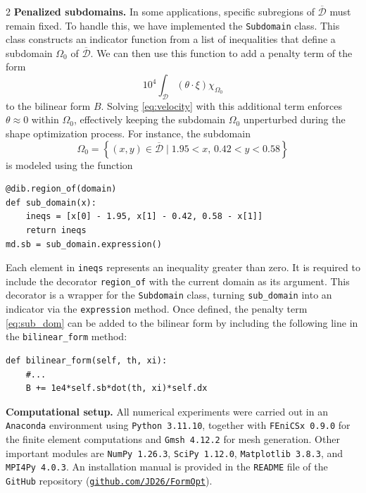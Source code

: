 \documentclass[a4paper, oneside]{article}
\newcommand{\Om}{\Omega}
\newcommand{\code}[1]{\texttt{#1}}
\begin{document}
\begin{multicols}{2}
\vspace*{0.5cm}
\noindent \textbf{Penalized subdomains.}
In some applications, specific subregions of $\overline{\mathcal{D}}$ must remain fixed. 
To handle this, we have implemented the \code{Subdomain} class.
This class constructs an indicator function from a list of inequalities that
define a subdomain $\Om_0$ of $\overline{\mathcal{D}}$. We can then use this function
to add a penalty term of the form
\begin{equation}\label{eq:sub_dom}
	{10}^4 \int_{\mathcal{D}} (\theta \cdot \xi) \chi_{\Omega_0}
\end{equation}
to the bilinear form $B$.
Solving \eqref{eq:velocity} with this additional term enforces $\theta \approx 0$ within $\Omega_0$, effectively keeping the subdomain $\Omega_0$ unperturbed during the shape optimization process.
For instance, the subdomain
\begin{equation}
	\Omega_0 = \left\{ (x,y)\in \overline{\mathcal{D}} \mid 1.95 < x,\, 0.42 < y < 0.58   \right\}
\end{equation}
is modeled using the function
\begin{lstlisting}
@dib.region_of(domain)
def sub_domain(x):
    ineqs = [x[0] - 1.95, x[1] - 0.42, 0.58 - x[1]]
    return ineqs
md.sb = sub_domain.expression()
\end{lstlisting}
Each element in \code{ineqs} represents an inequality greater than zero.
It is required to include the decorator \code{region\_of} with the
current domain as its argument. This decorator is a wrapper for the \code{Subdomain} class,
turning \code{sub\_domain} into an indicator via the \code{expression} method.
Once defined, the penalty term \eqref{eq:sub_dom}
can be added to the bilinear form by including the
following line in the \code{bilinear\_form} method:
\begin{lstlisting}
def bilinear_form(self, th, xi):
	#...
	B += 1e4*self.sb*dot(th, xi)*self.dx
\end{lstlisting}

\vspace*{0.5cm}
\noindent \textbf{Computational setup.}
All numerical experiments were carried out in an \code{Anaconda} environment using \code{Python~3.11.10},
together with \code{FEniCSx~0.9.0} for the finite element computations and
\code{Gmsh~4.12.2} for mesh generation. Other important modules are
\code{NumPy~1.26.3}, \code{SciPy~1.12.0}, \code{Matplotlib~3.8.3}, and \code{MPI4Py~4.0.3}.
An installation manual is provided in the \code{README} file of the \code{GitHub} repository
(\href{https://github.com/JD26/FormOpt}{\texttt{github.com/JD26/FormOpt}}).



\end{multicols}
\end{document}
